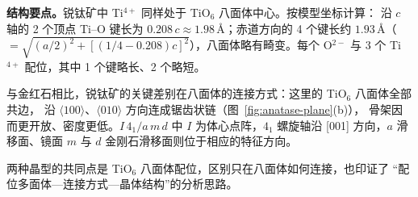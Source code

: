 \textbf{结构要点。}锐钛矿中 Ti$^{4+}$ 同样处于 TiO$_6$ 八面体中心。按模型坐标计算：
沿 $c$ 轴的 2 个顶点 Ti--O 键长为 $0.208\,c\approx1.98$\,\AA；赤道方向的 4 个键长约
$1.93$\,\AA（$=\sqrt{(a/2)^2+[(1/4-0.208)c]^2}$），八面体略有畸变。每个 O$^{2-}$ 与
3 个 Ti$^{4+}$ 配位，其中 1 个键略长、2 个略短。

与金红石相比，锐钛矿的关键差别在八面体的连接方式：这里的 TiO$_6$ 八面体全部共边，
沿 $\langle100\rangle$、$\langle010\rangle$ 方向连成锯齿状链（图~\ref{fig:anatase-plane}(b)），
骨架因而更开放、密度更低。$I\,4_1/a\,m\,d$ 中 $I$ 为体心点阵，$4_1$ 螺旋轴沿 [001]
方向，$a$ 滑移面、镜面 $m$ 与 $d$ 金刚石滑移面则位于相应的特征方向。

两种晶型的共同点是 TiO$_6$ 八面体配位，区别只在八面体如何连接，也印证了
``配位多面体—连接方式—晶体结构''的分析思路。
